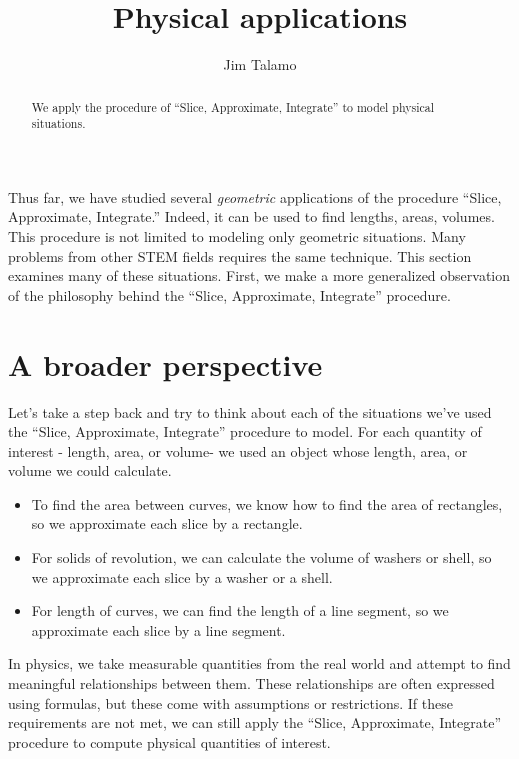 \documentclass{ximera}
\author{Jim Talamo}
\title[Dig-In:]{Physical applications}
\begin{document}
\begin{abstract}
We apply the procedure of ``Slice, Approximate, Integrate'' to model physical situations.
\end{abstract}
\maketitle

Thus far, we have studied several \emph{geometric} applications of the procedure  ``Slice, Approximate, Integrate.''  Indeed, it can be used to find lengths, areas, volumes.  This procedure is not limited to modeling only geometric situations.  Many problems from other STEM fields requires the same technique.  This section examines many of these situations.  First, we make a more generalized observation of the philosophy behind the ``Slice, Approximate, Integrate'' procedure.

\section{A broader perspective}
Let's take a step back and try to think about each of the situations we've used the ``Slice, Approximate, Integrate'' procedure to model.  For each quantity of interest - length, area, or volume- we used an object whose length, area, or volume we could calculate.  

\begin{itemize}
\item To find the area between curves, we know how to find the area of rectangles, so we approximate each slice by a rectangle.  
\item For solids of revolution, we can calculate the volume of washers or shell, so we approximate each slice by a washer or a shell. 
\item For length of curves, we can find the length of a line segment, so we approximate each slice by a line segment.
\end{itemize}

In physics, we take measurable quantities from the real world and attempt to find meaningful relationships between them.  These relationships are often expressed using formulas, but these come with assumptions or restrictions.  If these requirements are not met, we can still apply the ``Slice, Approximate, Integrate'' procedure to compute physical quantities of interest.
\end{document}
